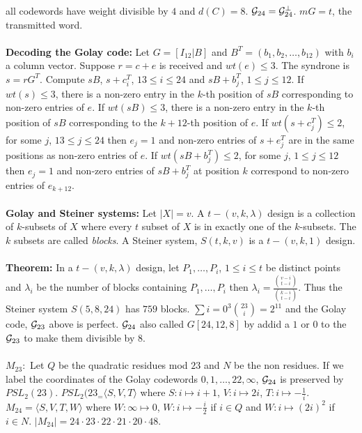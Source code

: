 all codewords have weight divisible by $4$ and $d(C)=8$.  
${\cal G}_{24} = {\cal G}_{24}^{\perp}$.  $mG=t$, the transmitted word.
\\
\\
{\bf Decoding the Golay code:} Let
$G=[I_{12} | B]$ and $B^T= (b_1 , b_2 , \ldots, b_{12})$ with $b_i$ a column vector.
Suppose $r=c+e$ is received and $wt(e) \le 3$.  The syndrone is $s= rG^T$.  Compute
$sB$, $s+c_i^T$, $13 \le i \le 24$ and $sB+b_j^T$, $1 \le j \le 12$.
If $wt(s) \le 3$, there is a non-zero entry in the $k$-th position of $sB$
corresponding to non-zero entries of $e$.
If $wt(sB) \le 3$, there is a non-zero entry in the $k$-th position of $sB$
corresponding to the $k+12$-th position of $e$.
If $wt(s+c_j^T) \le 2$, for some $j$, $13 \le j \le 24$ then $e_j=1$ and non-zero
entries of $s+e_j^T$ are in the same positions as non-zero entries of $e$.
If $wt(sB+b_j^T) \le 2$, for some $j$, $1 \le j \le 12$ then $e_j=1$ and non-zero
entries of $sB+b_j^T$ at position $k$ correspond to non-zero entries of $e_{k+12}$.
\\
\\
{\bf Golay and Steiner systems:} Let $|X|=v$.  A $t-(v,k, \lambda)$ design is a collection of $k$-subsets of
$X$ where every $t$ subset of $X$ is in exactly one of the $k$-subsets. The $k$ subsets are called \emph{blocks}.
A Steiner system, $S(t,k,v)$ is a $t-(v,k,1)$ design.
\\
\\
{\bf Theorem:} In a $t-(v,k, \lambda)$ design, let $P_1, \ldots, P_i$, $1 \leq i \leq t$
be distinct points and $\lambda_i$ be the number of blocks containing $P_1, \ldots, P_i$ then
$\lambda_i = {\frac {{{v-i} \choose {t-i}}} {{{k-i} \choose {t-i}}}}$.  Thus the Steiner system
$S(5,8,24)$ has $759$ blocks.  $\sum{i=0}^3 {23 \choose i} = 2^{11}$ and the Golay code, ${\cal G}_{23}$ above is perfect.
${\cal G}_{24}$ also called $G[24,12,8]$ by addid a $1$ or $0$ to the ${\cal G}_{23}$ to make them divisible by $8$.
\\
\\
{\bf $M_{23}:$}  Let $Q$ be the quadratic residues mod $23$ and $N$ be the non residues.  If we label the coordinates of
the Golay codewords $0,1, \ldots, 22, \infty$, ${\cal G}_{24}$ is preserved by $PSL_2(23)$.  
$PSL_2(23_ = \langle S, V, T\rangle$ where $S: i \mapsto i+1$, $V: i \mapsto 2i$, $T: i \mapsto - {\frac 1 i}$.
$M_{24} = \langle S, V, T, W\rangle$ where $W: \infty \mapsto 0$, 
$W: i \mapsto - {\frac i 2}$ if $i \in Q$ and
$W: i \mapsto  (2i)^2$ if $i \in N$. $|M_{24}| = 24 \cdot 23 \cdot 22 \cdot 21 \cdot 20 \cdot 48$.
